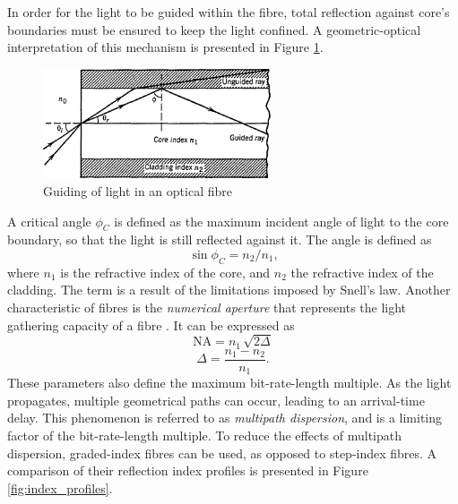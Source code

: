 \documentclass{standalone}
\begin{document}
In order for the light to be guided within the fibre, total reflection against core's boundaries must be ensured to keep the light confined. A geometric-optical interpretation of this mechanism is presented in Figure \ref{fig:critical_angle}.
\begin{figure}[h]
	\centering
	\includegraphics[width=0.6\textwidth]{critical_angle.png}
	\caption{Guiding of light in an optical fibre \cite{agrawal}}
	\label{fig:critical_angle}
\end{figure}
A critical angle $\phi_C$ is defined as the maximum incident angle of light to the core boundary, so that the light is still reflected against it. The angle is defined as
\begin{equation}
\sin \phi_C = n_2/n_1 \textrm{,}
\end{equation}
where $n_1$ is the refractive index of the core, and $n_2$ the refractive index of the cladding. The term is a result of the limitations imposed by Snell's law. Another characteristic of fibres is the \textit{numerical aperture} that represents the light gathering capacity of a fibre \cite{agrawal}. It can be expressed as 
\begin{equation}
\textrm{NA} = n_1 \, \sqrt{2 \varDelta}
\end{equation}
\begin{equation}
\varDelta = \frac{n_1 - n_2}{n_1} \textrm{.}
\end{equation}
These parameters also define the maximum bit-rate-length multiple. As the light propagates, multiple geometrical paths can occur, leading to an arrival-time delay. This phenomenon is referred to as \textit{multipath dispersion}, and is a limiting factor of the bit-rate-length multiple. To reduce the effects of multipath dispersion, graded-index fibres can be used, as opposed to step-index fibres. A comparison of their reflection index profiles is presented in Figure \ref{fig:index_profiles}.
\end{document}
